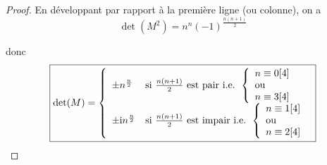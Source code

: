 \documentclass[12pt]{article}
\begin{document}
\begin{proof}
    En développant par rapport à la première ligne (ou colonne), on a 
    \begin{equation}
        \det(M^{2})=n^{n}(-1)^{\frac{n(n+1)}{2}}
    \end{equation}

    donc 
    \begin{equation}
        \boxed{\det(M)=
        \left\lbrace
            \begin{array}[]{ll}
                \pm n^{\frac{n}{2}} &\text{si }\frac{n(n+1)}{2}\text{ est pair i.e. }
                \left\lbrace
                \begin{array}[]{l}
                    n\equiv 0[4]\\
                    \text{ou}\\
                    n\equiv 3[4]
                \end{array}
                \right.\\
                \pm \i n^{\frac{n}{2}} &\text{si }\frac{n(n+1)}{2}\text{ est impair i.e. }
                \left\lbrace
                \begin{array}[]{l}
                    n\equiv 1[4]\\
                    \text{ou}\\
                    n\equiv 2[4]
                \end{array}
                \right.\\
            \end{array}
        \right.
        }
    \end{equation}
\end{proof}
\end{document}
